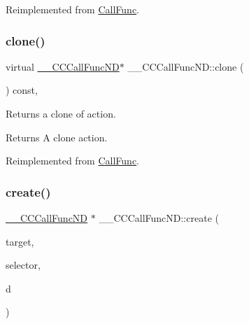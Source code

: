 Reimplemented from \hyperlink{classCallFunc_a87c2d0fecf4d8ae9d4b58a28e594daf0}{Call\+Func}.

\mbox{\label{class____CCCallFuncND_a1c4550d2841e8c7469f2831bedfa2726}} 
\subsubsection{\texorpdfstring{clone()}{clone()}\hspace{0.1cm}{\footnotesize\ttfamily [2/2]}}
{\footnotesize\ttfamily virtual \hyperlink{class____CCCallFuncND}{\+\_\+\+\_\+\+C\+C\+Call\+Func\+ND}$\ast$ \+\_\+\+\_\+\+C\+C\+Call\+Func\+N\+D\+::clone (\begin{DoxyParamCaption}\item[{void}]{ }\end{DoxyParamCaption}) const\hspace{0.3cm}{\ttfamily [override]}, {\ttfamily [virtual]}}

Returns a clone of action.

\begin{DoxyReturn}{Returns}
A clone action. 
\end{DoxyReturn}


Reimplemented from \hyperlink{classCallFunc_a87c2d0fecf4d8ae9d4b58a28e594daf0}{Call\+Func}.

\mbox{\label{class____CCCallFuncND_abcc540f0a13929a4c7115928d6ec5020}} 
\subsubsection{\texorpdfstring{create()}{create()}\hspace{0.1cm}{\footnotesize\ttfamily [1/2]}}
{\footnotesize\ttfamily \hyperlink{class____CCCallFuncND}{\+\_\+\+\_\+\+C\+C\+Call\+Func\+ND} $\ast$ \+\_\+\+\_\+\+C\+C\+Call\+Func\+N\+D\+::create (\begin{DoxyParamCaption}\item[{\hyperlink{classRef}{Ref} $\ast$}]{target,  }\item[{S\+E\+L\+\_\+\+Call\+Func\+ND}]{selector,  }\item[{void $\ast$}]{d }\end{DoxyParamCaption})\hspace{0.3cm}{\ttfamily [static]}}

